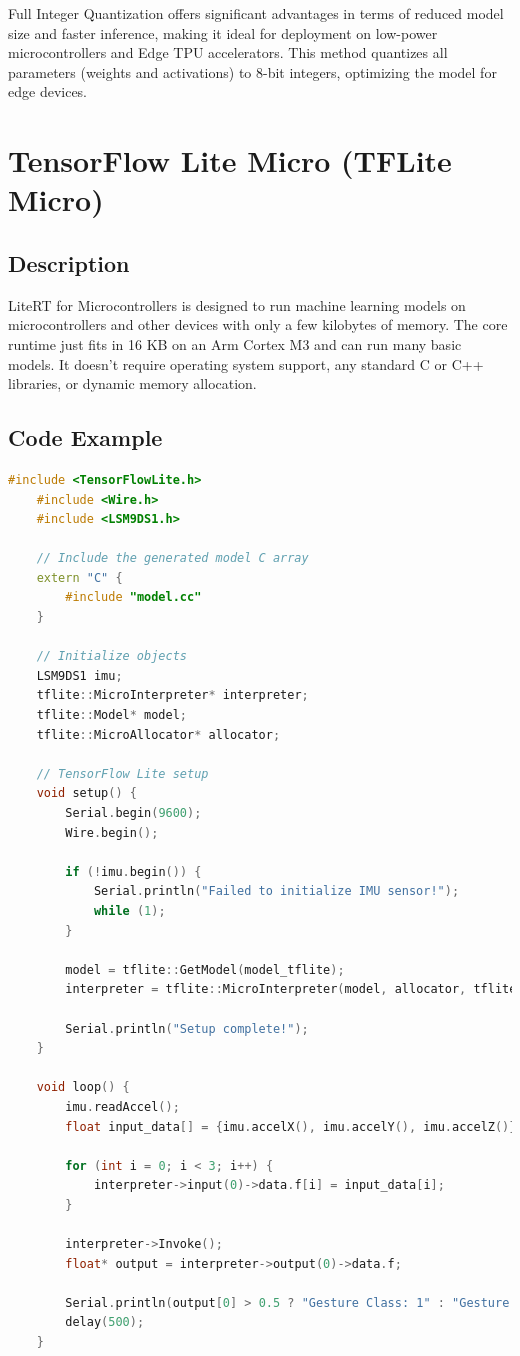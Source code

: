 Full Integer Quantization offers significant advantages in terms of reduced model size and faster inference, making it ideal for deployment on low-power microcontrollers and Edge TPU accelerators. This method quantizes all parameters (weights and activations) to 8-bit integers, optimizing the model for edge devices.\cite{tensorflowlite:2025}

\section{TensorFlow Lite Micro (TFLite Micro)}
\subsection{Description}
LiteRT for Microcontrollers is designed to run machine learning models on microcontrollers and other devices with only a few kilobytes of memory.\cite{litert:2023} The core runtime just fits in 16 KB on an Arm Cortex M3 and can run many basic models. It doesn't require operating system support, any standard C or C++ libraries, or dynamic memory allocation.\cite{litert:2023}

\subsection{Code Example}
\begin{lstlisting}[language=C++, caption={Integrating TensorFlow Lite with LSM9DS1 Sensor for Gesture Detection}, label={code:tflite-imu-setup}, style=bashstyle]
	#include <TensorFlowLite.h>
	#include <Wire.h>
	#include <LSM9DS1.h>
	
	// Include the generated model C array
	extern "C" {
		#include "model.cc"
	}
	
	// Initialize objects
	LSM9DS1 imu;
	tflite::MicroInterpreter* interpreter;
	tflite::Model* model;
	tflite::MicroAllocator* allocator;
	
	// TensorFlow Lite setup
	void setup() {
		Serial.begin(9600);
		Wire.begin();
		
		if (!imu.begin()) {
			Serial.println("Failed to initialize IMU sensor!");
			while (1);
		}
		
		model = tflite::GetModel(model_tflite);
		interpreter = tflite::MicroInterpreter(model, allocator, tflite::kTensorArenaSize);
		
		Serial.println("Setup complete!");
	}
	
	void loop() {
		imu.readAccel();
		float input_data[] = {imu.accelX(), imu.accelY(), imu.accelZ()};
		
		for (int i = 0; i < 3; i++) {
			interpreter->input(0)->data.f[i] = input_data[i];
		}
		
		interpreter->Invoke();
		float* output = interpreter->output(0)->data.f;
		
		Serial.println(output[0] > 0.5 ? "Gesture Class: 1" : "Gesture Class: 0");
		delay(500);
	}
\end{lstlisting}


